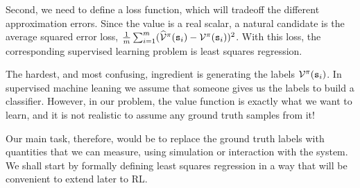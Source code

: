 Second, we need to define a loss function, which will tradeoff the different approximation errors. Since the value is a real scalar, a natural candidate is the average squared error loss, $\frac{1}{m}\sum_{i=1}^m (\widehat{\mathcal{V}}^\pi({\tt s}_i) - \mathcal{V}^\pi({\tt s}_i))^2$. With this loss, the corresponding supervised learning problem is least squares regression.

The hardest, and most confusing, ingredient is generating the labels
$\mathcal{V}^\pi({\tt s}_i)$. In supervised machine leaning we assume
that someone gives us the labels to build a classifier.
However, in our problem, the value function is exactly what we want to learn, and it is not realistic to assume any ground truth samples from it!

Our main task, therefore, would be to replace the ground truth labels with quantities that we can measure, using simulation or interaction with the system. We shall start by formally defining least squares regression in a way that will be convenient to extend later to RL.





